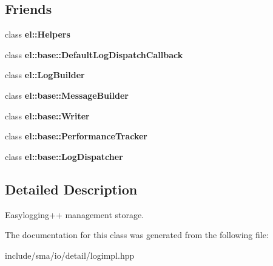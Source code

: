 \subsection*{Friends}
\begin{DoxyCompactItemize}
\item 
\hypertarget{classel_1_1base_1_1Storage_a2fb8a2c02cbf86247f093c118bed877a}{class {\bfseries el\-::\-Helpers}}\label{classel_1_1base_1_1Storage_a2fb8a2c02cbf86247f093c118bed877a}

\item 
\hypertarget{classel_1_1base_1_1Storage_a42b1de96d584ae4fecbfc2b9aff95052}{class {\bfseries el\-::base\-::\-Default\-Log\-Dispatch\-Callback}}\label{classel_1_1base_1_1Storage_a42b1de96d584ae4fecbfc2b9aff95052}

\item 
\hypertarget{classel_1_1base_1_1Storage_a8c584bcf767a4d007311a7408b22ad62}{class {\bfseries el\-::\-Log\-Builder}}\label{classel_1_1base_1_1Storage_a8c584bcf767a4d007311a7408b22ad62}

\item 
\hypertarget{classel_1_1base_1_1Storage_a81bbf6fe31fab133d182efa8367304f1}{class {\bfseries el\-::base\-::\-Message\-Builder}}\label{classel_1_1base_1_1Storage_a81bbf6fe31fab133d182efa8367304f1}

\item 
\hypertarget{classel_1_1base_1_1Storage_a7a728edbb2761d151832daa74d5b2736}{class {\bfseries el\-::base\-::\-Writer}}\label{classel_1_1base_1_1Storage_a7a728edbb2761d151832daa74d5b2736}

\item 
\hypertarget{classel_1_1base_1_1Storage_a6a4d7851e1984800be3c230f06a79528}{class {\bfseries el\-::base\-::\-Performance\-Tracker}}\label{classel_1_1base_1_1Storage_a6a4d7851e1984800be3c230f06a79528}

\item 
\hypertarget{classel_1_1base_1_1Storage_a9b37b28ea1c5f8f862cc89f135711d92}{class {\bfseries el\-::base\-::\-Log\-Dispatcher}}\label{classel_1_1base_1_1Storage_a9b37b28ea1c5f8f862cc89f135711d92}

\end{DoxyCompactItemize}


\subsection{Detailed Description}
Easylogging++ management storage. 

The documentation for this class was generated from the following file\-:\begin{DoxyCompactItemize}
\item 
include/sma/io/detail/logimpl.\-hpp\end{DoxyCompactItemize}

